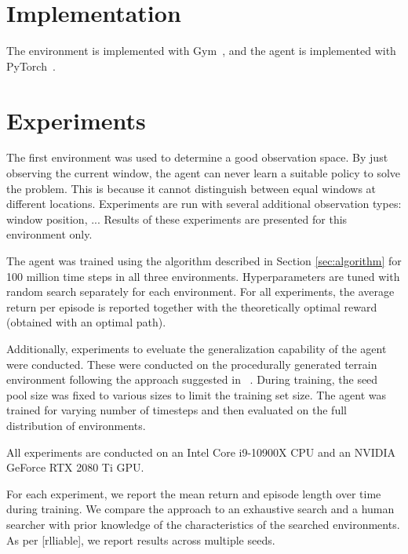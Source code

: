 


\section{Implementation}

The environment is implemented with Gym~\cite{gym}, and the agent is implemented with PyTorch~\cite{pytorch}. 


\section{Experiments}

The first environment was used to determine a good observation space.
By just observing the current window, the agent can never learn a suitable policy to solve the problem.
This is because it cannot distinguish between equal windows at different locations.
Experiments are run with several additional observation types: window position, ...
Results of these experiments are presented for this environment only.

The agent was trained using the algorithm described in Section \ref{sec:algorithm} for 100 million time steps in all three environments.
Hyperparameters are tuned with random search separately for each environment.
For all experiments, the average return per episode is reported together with the theoretically optimal reward (obtained with an optimal path).

Additionally, experiments to eveluate the generalization capability of the agent were conducted.
These were conducted on the procedurally generated terrain environment following the approach suggested in ~\cite{procgen}.
During training, the seed pool size was fixed to various sizes to limit the training set size.
The agent was trained for varying number of timesteps and then evaluated on the full distribution of environments.

All experiments are conducted on an Intel Core i9-10900X CPU and an NVIDIA GeForce RTX 2080 Ti GPU.

For each experiment, we report the mean return and episode length over time during training.
We compare the approach to an exhaustive search and a human searcher with prior knowledge of the characteristics of the searched environments.
As per [rlliable], we report results across multiple seeds.


